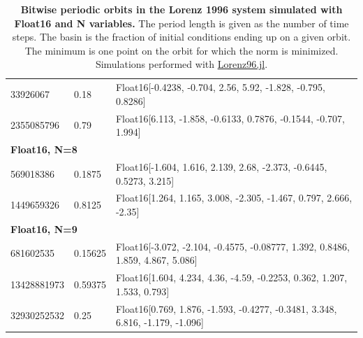\begin{table}[htbp]
\begin{tabular}{l | l | l}
33926067 & 0.18 & Float16[-0.4238, -0.704, 2.56, 5.92, -1.828, -0.795, 0.8286] \\
2355085796 & 0.79 & Float16[6.113, -1.858, -0.6133, 0.7876, -0.1544, -0.707, 1.994] \\
	\multicolumn{3}{l}{\textbf{Float16, N=8}}  \\
569018386 & 0.1875 & Float16[-1.604, 1.616, 2.139, 2.68, -2.373, -0.6445, 0.5273, 3.215] \\
1449659326 & 0.8125 & Float16[1.264, 1.165, 3.008, -2.305, -1.467, 0.797, 2.666, -2.35] \\
	\multicolumn{3}{l}{\textbf{Float16, N=9}} \\
681602535 & 0.15625 & Float16[-3.072, -2.104, -0.4575, -0.08777, 1.392, 0.8486, 1.859, 4.867, 5.086] \\
13428881973 & 0.59375 & Float16[1.604, 4.234, 4.36, -4.59, -0.2253, 0.362, 1.207, 1.533, 0.793] \\
32930252532 & 0.25 & Float16[0.769, 1.876, -1.593, -0.4277, -0.3481, 3.348, 6.816, -1.179, -1.096]
        \end{tabular}
	\caption{\textbf{Bitwise periodic orbits in the Lorenz 1996 system simulated with Float16 and N variables.}
	The period length is given as the number of time steps. The basin is the fraction of initial conditions ending
	up on a given orbit. The minimum is one point on the orbit for which the norm is minimized. Simulations
	performed with \href{https://github.com/milankl/Lorenz96.jl}{Lorenz96.jl}.}
	\label{tab:orbits}
\end{table}

